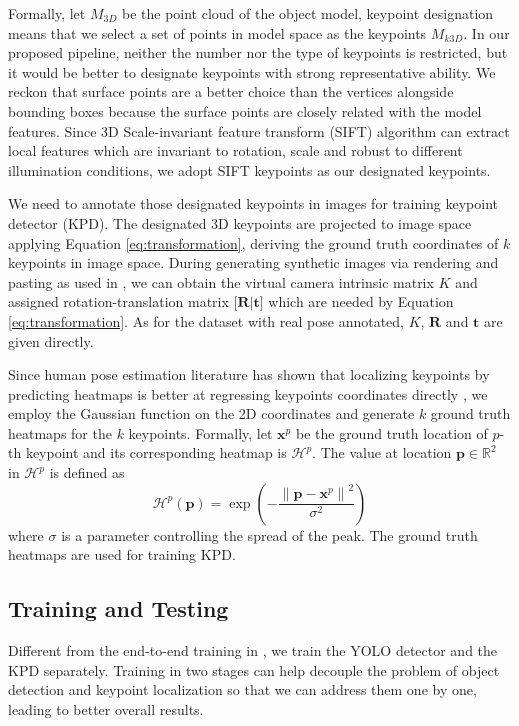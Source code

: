\documentclass[10pt,twocolumn,letterpaper]{article}
\begin{document}
Formally, let $M_{3D}$ be the point cloud of the object model, keypoint designation means that we select a set of points in model space as the keypoints $M_{k3D}$. In our proposed pipeline, neither the number nor the type of keypoints is restricted, but it would be better to designate keypoints with strong representative ability. We reckon that surface points are a better choice than the vertices alongside bounding boxes because the surface points are closely related with the model features. Since 3D Scale-invariant feature transform (SIFT) algorithm \cite{Scovanner:2007:SDA:1291233.1291311} can extract local features which are invariant to rotation, scale and robust to different illumination conditions, we adopt SIFT keypoints as our designated keypoints.

We need to annotate those designated keypoints in images for training keypoint detector (KPD). The designated 3D keypoints are projected to image space applying Equation \ref{eq:transformation}, deriving the ground truth coordinates of $k$ keypoints in image space. During generating synthetic images via rendering and pasting as used in \cite{Kehl2017SSD6DMR,Sundermeyer_2018_ECCV,Rad2017BB8AS}, we can obtain the virtual camera intrinsic matrix $K$ and assigned rotation-translation matrix $\big[\mathbf{R}\big|\mathbf{t}\big]$ which are needed by Equation \ref{eq:transformation}. As for the dataset with real pose annotated, $K$, $\mathbf{R}$ and $\mathbf{t}$ are given directly.

Since human pose estimation literature has shown that localizing keypoints by predicting heatmaps \cite{Newell2016StackedHN, tompson2014joint, wei2016convolutional} is better at regressing keypoints coordinates directly \cite{toshev2014deeppose}, we employ the Gaussian function on the 2D coordinates and generate $k$ ground truth heatmaps for the $k$ keypoints. Formally, let $\mathbf{x}^{p}$ be the ground truth location of $p$-th keypoint and its corresponding heatmap is $\mathcal{H}^{p}$. The value at location $\mathbf{p} \in \mathbb{R}^{2}$ in $\mathcal{H}^{p}$ is defined as
\begin{equation}
\label{eq:gaussian}
\mathcal{H}^{p}( \mathbf { p } ) = \exp \left( - \frac { \left\| \mathbf { p } - \mathbf{x}^{p} \right\| ^ { 2 } } { \sigma ^ { 2 } } \right)
\end{equation}
where $\sigma$ is a parameter controlling the spread of the peak. The ground truth heatmaps are used for training KPD.

\subsection{Training and Testing}
Different from the end-to-end training in \cite{tekin18}, we train the YOLO detector and the KPD separately. Training in two stages can help decouple the problem of object detection and keypoint localization so that we can address them one by one, leading to better overall results.
\end{document}
